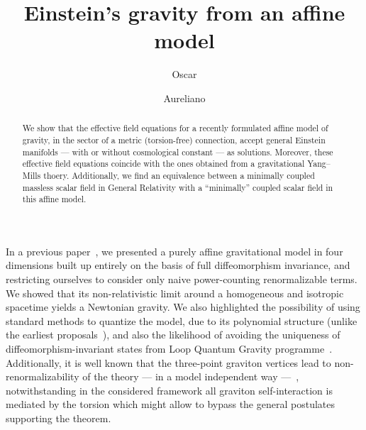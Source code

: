 \documentclass[aps,prl,twocolumn,superscriptaddress,showpacs,showkeys]{revtex4-1}
\begin{document}
\title{Einstein's gravity from an affine model}

\author{Oscar }

\author{Aureliano }


\begin{abstract}
  We show that the effective field equations for a recently formulated affine model of gravity, in the sector of a metric (torsion-free) connection, accept general Einstein manifolds --- with or without cosmological constant --- as solutions. Moreover, these effective field equations coincide with the ones obtained from a gravitational Yang--Mills thoery. Additionally, we find an equivalence between a minimally coupled massless scalar field in General Relativity with a ``minimally'' coupled scalar field in this affine model.
\end{abstract}



\maketitle

In a previous paper~\cite{Skirzewski:2014eta}, we presented a purely affine gravitational model in four dimensions built up entirely on the basis of full diffeomorphism invariance, and restricting ourselves to consider only naive power-counting renormalizable terms. We showed that its non-relativistic limit around a homogeneous and isotropic spacetime yields a Newtonian gravity. We also highlighted the possibility of using standard methods to quantize the model, due to its polynomial structure (unlike the earliest proposals~\cite{Eddington1923math,schrodinger1950space}), and also the likelihood of avoiding the uniqueness of diffeomorphism-invariant states from Loop Quantum Gravity programme~\cite{Lewandowski:2005jk}. Additionally, it is well known that the three-point graviton vertices lead to non-renormalizability of the theory --- in a model independent way ---~\cite{McGady:2013sga,Camanho:2014apa}, notwithstanding in the considered framework all graviton self-interaction is mediated by the torsion which might allow to bypass the general postulates supporting the theorem.
\end{document}
